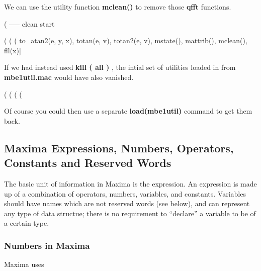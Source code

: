 \documentclass[11pt]{article}
\newcommand{\tcbr}{\textcolor{BrickRed}}
\newcommand{\mv}{\Verb[fontfamily=courier,fontseries=b]}
\newcommand{\mvs}{\Verb[fontfamily=courier,fontseries=b,fontsize=\small]}
\begin{document}
We can use the utility function \textbf{mclean()} to remove those \textbf{qfft} functions.
\begin{myVerbatim}
(%
----- clean start 
   
(%
(%
(%
to_atan2(e, y, x), totan(e, v), totan2(e, v), mstate(), mattrib(), mclean(), 
fll(x)]
\end{myVerbatim}
If we had instead used \textbf{kill ( all ) }, the intial set of utilities
  loaded in from \textbf{mbe1util.mac} would have also vanished.
\begin{myVerbatim}
(%
(%
(%
(%
\end{myVerbatim}
Of course you could then use a separate \textbf{load(mbe1util)} command to get them back.
\newpage
\subsection{Maxima Expressions, Numbers, Operators, Constants and Reserved Words}
The basic unit of information in Maxima is the \tcbr{expression}.
 An \tcbr{expression} is made up of a combination of operators, numbers, variables, and constants.
 \tcbr{Variables} should have names which are not reserved words (see below),
   and can represent any type of data structue; there is no requirement to
   ``declare'' a variable to be  of a certain type.
\subsubsection*{Numbers in Maxima}
Maxima uses 
\end{document}

